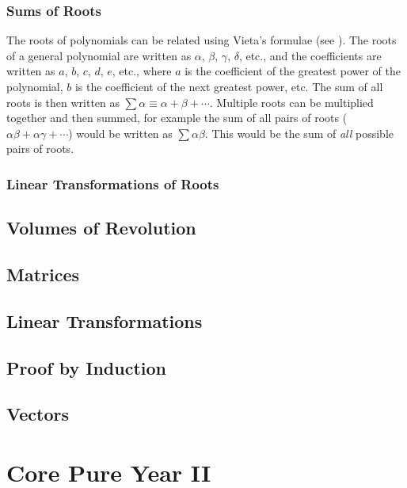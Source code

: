 \documentclass{book}
\begin{document}
        \subsection{Sums of Roots}
            The \glspl{root} of \glspl{polynomial} can be related using Vieta's formulae (see ).
            The \glspl{root} of a general \gls{polynomial} are written as $\alpha$, $\beta$, $\gamma$, $\delta$, etc., and the coefficients are written as $a$, $b$, $c$, $d$, $e$, etc., where $a$ is the coefficient of the greatest power of the \gls{polynomial}, $b$ is the coefficient of the next greatest power, etc.
            The sum of all \glspl{root} is then written as $\sum\alpha\equiv\alpha+\beta+\cdots$.
            Multiple \glspl{root} can be multiplied together and then summed, for example the sum of all pairs of \glspl{root} ($\alpha\beta+\alpha\gamma+\cdots$) would be written as $\sum\alpha\beta$.
            This would be the sum of \textit{all} possible pairs of \glspl{root}.

        \subsection{Linear Transformations of Roots}

    \newpage
    \newpage
    \section{Volumes of Revolution} \label{volumes_of_revolution}
    \newpage
    \section{Matrices} \label{matricies}
    \newpage
    \section{Linear Transformations} \label{linear_transformations}
    \newpage
    \section{Proof by Induction} \label{proof_by_induction}
    \newpage
    \section{Vectors} \label{vectors}
    \newpage

\chapter{Core Pure Year II} \label{ch:core_pure_ii}
\end{document}
